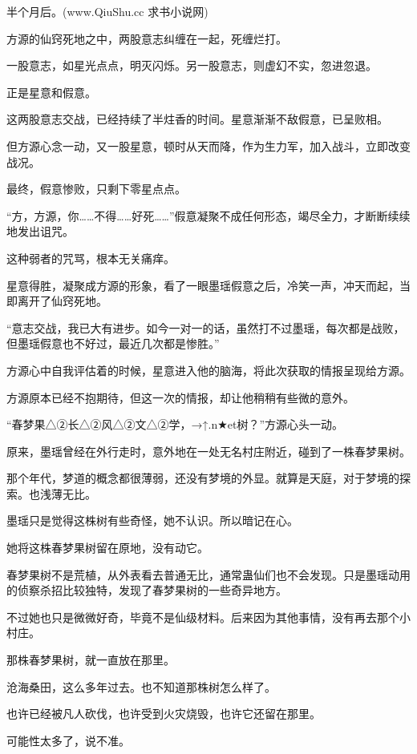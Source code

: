 
\begin{this_body}

半个月后。(www.QiuShu.cc 求书小说网)

方源的仙窍死地之中，两股意志纠缠在一起，死缠烂打。

一股意志，如星光点点，明灭闪烁。另一股意志，则虚幻不实，忽进忽退。

正是星意和假意。

这两股意志交战，已经持续了半炷香的时间。星意渐渐不敌假意，已呈败相。

但方源心念一动，又一股星意，顿时从天而降，作为生力军，加入战斗，立即改变战况。

最终，假意惨败，只剩下零星点点。

“方，方源，你……不得……好死……”假意凝聚不成任何形态，竭尽全力，才断断续续地发出诅咒。

这种弱者的咒骂，根本无关痛痒。

星意得胜，凝聚成方源的形象，看了一眼墨瑶假意之后，冷笑一声，冲天而起，当即离开了仙窍死地。

“意志交战，我已大有进步。如今一对一的话，虽然打不过墨瑶，每次都是战败，但墨瑶假意也不好过，最近几次都是惨胜。”

方源心中自我评估着的时候，星意进入他的脑海，将此次获取的情报呈现给方源。

方源原本已经不抱期待，但这一次的情报，却让他稍稍有些微的意外。

“春梦果△②长△②风△②文△②学，→↑.n★et树？”方源心头一动。

原来，墨瑶曾经在外行走时，意外地在一处无名村庄附近，碰到了一株春梦果树。

那个年代，梦道的概念都很薄弱，还没有梦境的外显。就算是天庭，对于梦境的探索。也浅薄无比。

墨瑶只是觉得这株树有些奇怪，她不认识。所以暗记在心。

她将这株春梦果树留在原地，没有动它。

春梦果树不是荒植，从外表看去普通无比，通常蛊仙们也不会发现。只是墨瑶动用的侦察杀招比较独特，发现了春梦果树的一些奇异地方。

不过她也只是微微好奇，毕竟不是仙级材料。后来因为其他事情，没有再去那个小村庄。

那株春梦果树，就一直放在那里。

沧海桑田，这么多年过去。也不知道那株树怎么样了。

也许已经被凡人砍伐，也许受到火灾烧毁，也许它还留在那里。

可能性太多了，说不准。


\end{this_body}
